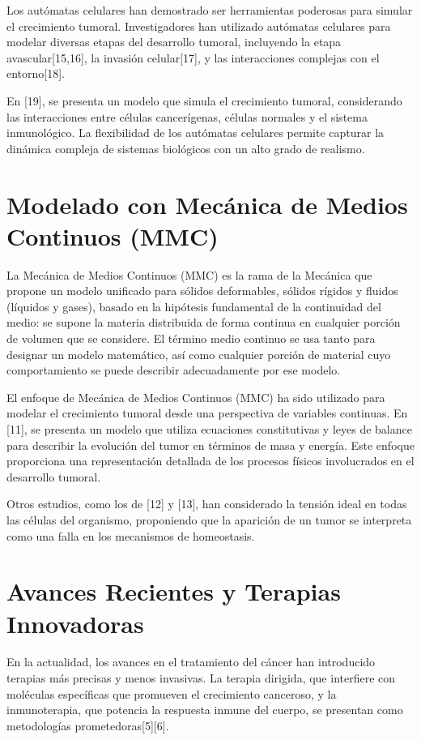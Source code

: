 Los autómatas celulares han demostrado ser herramientas poderosas para simular el crecimiento tumoral. Investigadores han utilizado autómatas celulares para modelar diversas etapas del desarrollo tumoral, incluyendo la etapa avascular[15,16], la invasión celular[17], y las interacciones complejas con el entorno[18].

En [19], se presenta un modelo que simula el crecimiento tumoral, considerando las interacciones entre células cancerígenas, células normales y el sistema inmunológico. La flexibilidad de los autómatas celulares permite capturar la dinámica compleja de sistemas biológicos con un alto grado de realismo.

\section{Modelado con Mecánica de Medios Continuos (MMC)}
La Mecánica de Medios Continuos (MMC) es la rama de la Mecánica que propone un modelo unificado para sólidos deformables, sólidos rígidos y fluidos (líquidos y gases), basado en la hipótesis fundamental de la continuidad del medio: se supone la materia distribuida de forma continua en cualquier porción de volumen que se considere. El término medio continuo se usa tanto para designar un modelo matemático, así como cualquier porción de material cuyo comportamiento se puede describir adecuadamente por ese modelo.

El enfoque de Mecánica de Medios Continuos (MMC) ha sido utilizado para modelar el crecimiento tumoral desde una perspectiva de variables continuas. En [11], se presenta un modelo que utiliza ecuaciones constitutivas y leyes de balance para describir la evolución del tumor en términos de masa y energía. Este enfoque proporciona una representación detallada de los procesos físicos involucrados en el desarrollo tumoral.

Otros estudios, como los de [12] y [13], han considerado la tensión ideal en todas las células del organismo, proponiendo que la aparición de un tumor se interpreta como una falla en los mecanismos de homeostasis.

\section{Avances Recientes y Terapias Innovadoras}

En la actualidad, los avances en el tratamiento del cáncer han introducido terapias más precisas y menos invasivas. La terapia dirigida, que interfiere con moléculas específicas que promueven el crecimiento canceroso, y la inmunoterapia, que potencia la respuesta inmune del cuerpo, se presentan como metodologías prometedoras[5][6].

